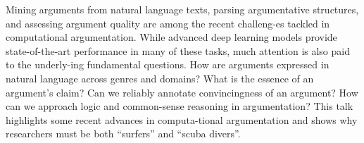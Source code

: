Mining arguments from natural language texts, parsing argumentative structures, and assessing argument quality are among the recent challeng-es tackled in computational argumentation. While advanced deep learning models provide state-of-the-art performance in many of these tasks, much attention is also paid to the underly-ing fundamental questions. How are arguments expressed in natural language across genres and domains? What is the essence of an argument's claim? Can we reliably annotate convincingness of an argument? How can we approach logic and common-sense reasoning in argumentation? This talk highlights some recent advances in computa-tional argumentation and shows why researchers must be both ``surfers'' and ``scuba divers''.
